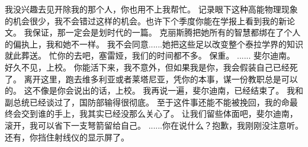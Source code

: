 \documentclass[openany]{book}
\begin{document}
\begin{dialogue}
     我没兴趣去见开除我的那个人，你也用不上我帮忙。
     记录眼下这种高能物理现象的机会很少，我不会错过这样的机会。也许下个季度你能在学报上看到我的新论文。
     我保证，那一定会是划时代的一篇。
     克丽斯腾把她所有的智慧都绑在了个人的偏执上，我和她不一样。
     我不会同意......她把这些足以改变整个泰拉学界的知识就此葬送。
     忙你的去吧，塞雷娅，我们的时间都不多。
     保重。
     ......
     斐尔迪南。
     好久不见，上校。
     你能活下来，我不意外，但如果我是你，我会假装自己已经死了。
     离开这里，跑去维多利亚或者莱塔尼亚，凭你的本事，谋一份教职总是可以的。
     这不像是你会说出的话，上校。
     我再说一遍，斐尔迪南，已经结束了。
     我和副总统已经谈过了，国防部输得很彻底。
     至于这件事还能不能被挽回，我的命最终会交到谁的手上，我其实已经没那么关心了。
     让我们留些体面吧，斐尔迪南，滚开，我可以省下一支弩箭留给自己。
     ......你在说什么？抱歉，我刚刚没注意听。
     还有，你挡住射线仪的显示屏了。
\end{dialogue}
\end{document}
